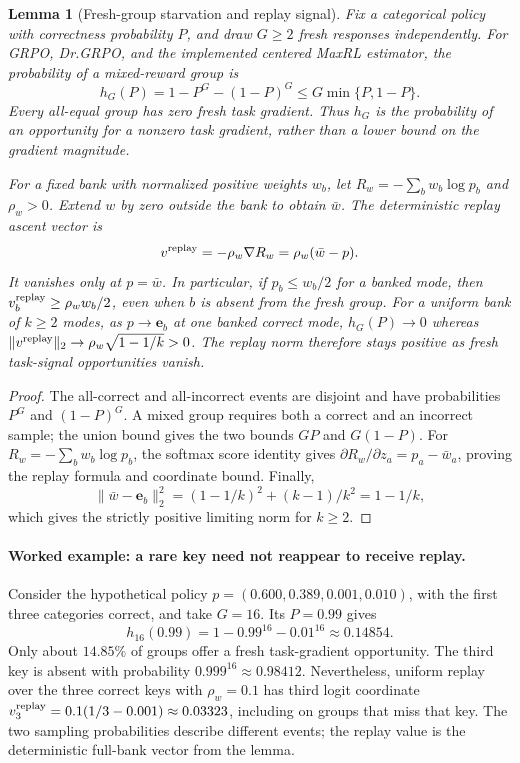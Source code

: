 \documentclass{article}
\newcommand{\1}{\mathbf 1}
\newtheorem{lemma}{Lemma}[section]
\theoremstyle{remark}
\theoremstyle{definition}
\theoremstyle{plain}
\begin{document}
\begin{lemma}[Fresh-group starvation and replay signal]
\label{lem:replay-gradient-availability}
Fix a categorical policy with correctness probability $P$, and draw $G\ge2$
fresh responses independently. For GRPO, Dr.GRPO, and the implemented centered
MaxRL estimator, the probability of a mixed-reward group is
\[
 h_G(P)=1-P^G-(1-P)^G\le G\min\{P,1-P\}.
\]
Every all-equal group has zero fresh task gradient. Thus $h_G$ is the
probability of an opportunity for a nonzero task gradient, rather than a
lower bound on the gradient magnitude.

For a fixed bank with normalized positive weights $w_b$, let
$R_w=-\sum_b w_b\log p_b$ and $\rho_w>0$. Extend $w$ by zero outside the
bank to obtain $\bar w$. The deterministic replay ascent vector is
\[
 v^{\rm replay}=-\rho_w\nabla R_w=\rho_w(\bar w-p).
\]
It vanishes only at $p=\bar w$. In particular, if $p_b\le w_b/2$ for a banked
mode, then $v^{\rm replay}_b\ge\rho_w w_b/2$, even when $b$ is absent from the
fresh group. For a uniform bank of $k\ge2$ modes, as $p\to\mathbf e_b$ at
one banked correct mode, $h_G(P)\to0$ whereas
$\|v^{\rm replay}\|_2\to\rho_w\sqrt{1-1/k}>0$.
The replay norm therefore stays positive as fresh task-signal opportunities vanish.
\end{lemma}

\begin{proof}
The all-correct and all-incorrect events are disjoint and have probabilities
$P^G$ and $(1-P)^G$. A mixed group requires both a correct and an incorrect
sample; the union bound gives the two bounds $GP$ and $G(1-P)$.
For $R_w=-\sum_b w_b\log p_b$, the softmax score identity gives
$\partial R_w/\partial z_a=p_a-\bar w_a$, proving the replay formula and
coordinate bound. Finally,
\[
 \|\bar w-\mathbf e_b\|_2^2=(1-1/k)^2+(k-1)/k^2=1-1/k,
\]
which gives the strictly positive limiting norm for $k\ge2$.
\end{proof}

\paragraph{Worked example: a rare key need not reappear to receive replay.}
Consider the hypothetical policy $p=(0.600,0.389,0.001,0.010)$, with the
first three categories correct, and take $G=16$. Its $P=0.99$ gives
\[
 h_{16}(0.99)=1-0.99^{16}-0.01^{16}\approx0.14854.
\]
Only about $14.85\%$ of groups offer a fresh task-gradient opportunity.
The third key is absent with probability $0.999^{16}\approx0.98412$.
Nevertheless, uniform replay over the three correct keys with $\rho_w=0.1$
has third logit coordinate
$v^{\rm replay}_3=0.1(1/3-0.001)\approx0.03323$, including on groups that
miss that key. The two sampling probabilities describe different events;
the replay value is the deterministic full-bank vector from the lemma.
\end{document}
